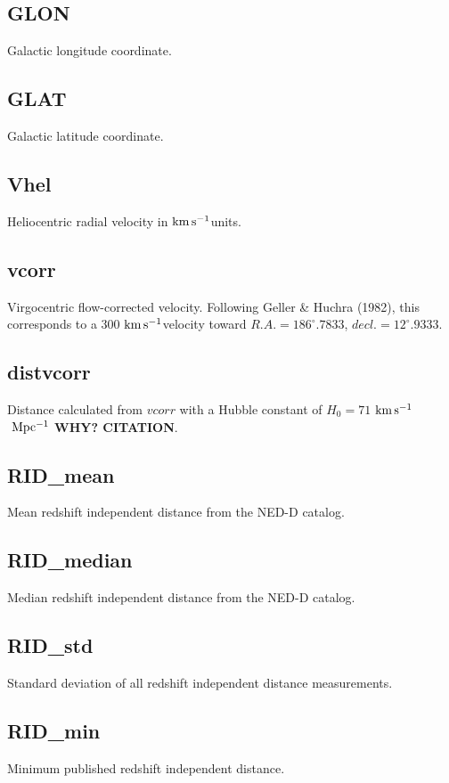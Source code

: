 \documentclass[iop]{emulateapj-rtx4}
\newcommand{\kms}{$\rm km\, s^{-1}$}
\begin{document}
\subsection{GLON}
Galactic longitude coordinate.

\subsection{GLAT}
Galactic latitude coordinate.

\subsection{Vhel}
Heliocentric radial velocity in \kms units.

\subsection{vcorr}
Virgocentric flow-corrected velocity. Following Geller \& Huchra (1982), this corresponds to a 300 \kms velocity toward $R.A. = 186^{\circ}.7833$, $decl. = 12^{\circ}.9333$.

\subsection{distvcorr}
Distance calculated from $vcorr$ with a Hubble constant of $H_0 = 71$ \kms $~\rm Mpc^{-1}$ \textbf{WHY? CITATION}.

\subsection{RID\_mean}
Mean redshift independent distance from the NED-D catalog.

\subsection{RID\_median}
Median redshift independent distance from the NED-D catalog.

\subsection{RID\_std}
Standard deviation of all redshift independent distance measurements.

\subsection{RID\_min}
Minimum published redshift independent distance.
\end{document}
